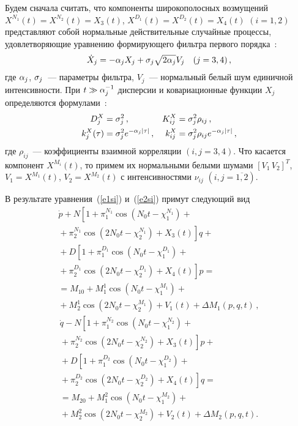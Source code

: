 \begin{multicols}{2}
Будем сначала считать, что компоненты широкополосных
возмущений
$X^{N_1} (t) = X^{N_2} (t) = X_3 (t)$, $ X^{D_1}
(t) =X^{D_2} (t) = X_4 (t)$ $(i=1,2)$ представляют собой
нормальные действительные случайные процессы, удовлетворяющие
уравнению формирующего фильтра первого порядка~\cite{23s}:
 \begin{equation}
 \dot X_j =- \alpha_j X_j +\sigma_j \sqrt{2\alpha_j}V_j \quad (j=3,4)\,,\label{e6s}
 \end{equation}
где $\alpha_j$, $\sigma_j$~--- параметры фильтра, $V_j$~--- нормальный
белый шум единичной интенсивности. При $t\gg \alpha_j^{-1}$
дисперсии и ковариационные функции $X_j$ определяются формулами~\cite{23s}:
 \begin{align*}
 D_j^X &=\si_j^2\,,& K_{ij}^X &=\si_j^2 \rho_{ij}\,,\\
 k_j^X (\tau) &=\si_j^2 e^{-\alp_j \vert \tau\vert}\,,&
 k_{ij}^X &=\si_j^2 \rho_{ij} e^{-\alp_j \vert \tau\vert}\,, %
 \end{align*}
где $\rho_{ij}$~--- коэффициенты взаимной корреляции $(i,j=3,4)$. Что
касается компонент $X^{M_i}(t)$, то примем их нормальными белыми
шумами $\left[ V_1\, V_2\right]^T$, $ V_1 = X^{M_1} (t)$, $V_2 =
X^{M_2} (t)$ с интенсивностями $\nu_{ij}$ $(i,j=\overline{1,2})$.

В результате уравнения~(\ref{e1si}) и~(\ref{e2si}) примут следу\-ющий вид
\begin{multline*}
\dot p + N \left[ 1 +\pi_1^{N_1} \cos \left(N_0 t -\chi_1^{N_1} \right) +{}\right.\\
\left.{}+\pi_2^{N_1} \cos \left(2N_0 t -\chi_2^{N_1} \right)+ X_3 (t)\right]q +{}\\
{}+ D \left[ 1+\pi_1^{D_1} \cos \left(N_0 t -\chi_1^{D_1} \right)+{}\right.\\
\left.{}+ \pi_2^{D_1} \cos \left(2N_0 t -\chi_2^{D_1} \right)+ X_4(t)\right] p={}\\
 {}= M_{10} +M_1^1 \cos \left(N_0 t -\chi_1^{M_1}\right) +{}\\
 {}+ M_2^1 \cos \left(2 N_0t -\chi_2^{M_1}\right) + V_1(t)+ \Delta M_1 (p,q,t)\,,
\end{multline*}
\begin{multline}
\dot q - N \left[ 1 +\pi_1^{N_2} \cos \left(N_0 t -\chi_1^{N_2} \right) +{}\right.\\
\left.{}+\pi_2^{N_2} \cos \left(2N_0 t -\chi_2^{N_2} \right)+ X_3 (t)\right] p + {}\\
{}+D \left[ 1+\pi_1^{D_2} \cos \left(N_0 t -\chi_1^{D_2} \right)+{}\right.\\
\left.{}+ \pi_2^{D_2} \cos \left(2N_0 t -\chi_2^{D_2} \right)+ X_4(t)\right] q={}\\
 {}= M_{20} + M_1^2 \cos \left(N_0 t -\chi_1^{M_2} \right)+ {}\\
\!\! +M_2^2 \cos \left(2 N_0t -\chi_2^{M_2}\right) + V_2(t) + \Delta M_2 (p,q,t).
 \label{e8s}
\end{multline}


\end{multicols}
